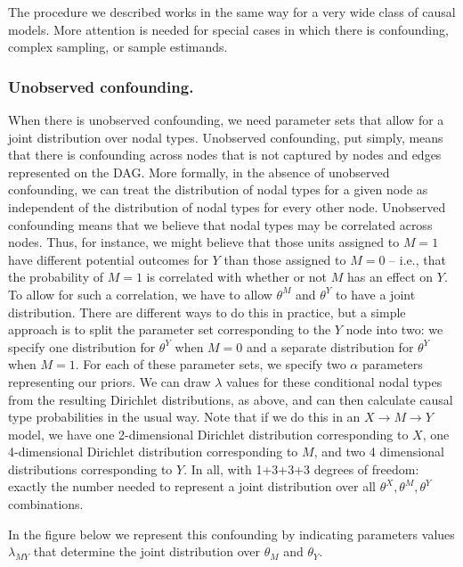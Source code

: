 \documentclass[
  12pt,
]{book}
\begin{document}
The procedure we described works in the same way for a very wide class of causal models. More attention is needed for special cases in which there is confounding, complex sampling, or sample estimands.

\hypertarget{unobserved-confounding.}{%
\subsubsection{Unobserved confounding.}\label{unobserved-confounding.}}

When there is unobserved confounding, we need parameter sets that allow for a joint distribution over nodal types. Unobserved confounding, put simply, means that there is confounding across nodes that is not captured by nodes and edges represented on the DAG. More formally, in the absence of unobserved confounding, we can treat the distribution of nodal types for a given node as independent of the distribution of nodal types for every other node. Unobserved confounding means that we believe that nodal types may be correlated across nodes. Thus, for instance, we might believe that those units assigned to \(M=1\) have different potential outcomes for \(Y\) than those assigned to \(M=0\) -- i.e., that the probability of \(M=1\) is correlated with whether or not \(M\) has an effect on \(Y\). To allow for such a correlation, we have to allow \(\theta^M\) and \(\theta^Y\) to have a joint distribution. There are different ways to do this in practice, but a simple approach is to split the parameter set corresponding to the \(Y\) node into two: we specify one distribution for \(\theta^Y\) when \(M=0\) and a separate distribution for \(\theta^Y\) when \(M=1\). For each of these parameter sets, we specify two \(\alpha\) parameters representing our priors. We can draw \(\lambda\) values for these conditional nodal types from the resulting Dirichlet distributions, as above, and can then calculate causal type probabilities in the usual way. Note that if we do this in an \(X \rightarrow M \rightarrow Y\) model, we have one 2-dimensional Dirichlet distribution corresponding to \(X\), one 4-dimensional Dirichlet distribution corresponding to \(M\), and two 4 dimensional distributions corresponding to \(Y\). In all, with 1+3+3+3 degrees of freedom: exactly the number needed to represent a joint distribution over all \(\theta^X, \theta^M, \theta^Y\) combinations.

In the figure below we represent this confounding by indicating parameters values \(\lambda_{MY}\) that determine the joint distribution over \(\theta_M\) and \(\theta_Y\).
\end{document}
